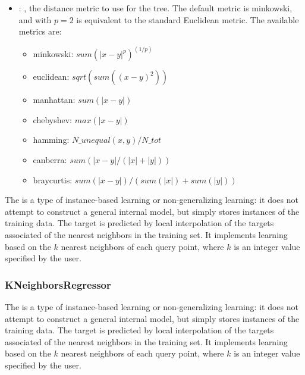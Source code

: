 \begin{itemize}
    \item {}: , 
      the distance metric to use for the tree. The default metric is minkowski, and with
      $p=2$ is equivalent to the standard Euclidean metric.
      The available metrics are:                                                  \begin{itemize}
      \item minkowski: $sum(|x - y|^p)^(1/p)$
      \item euclidean: $sqrt(sum((x - y)^2))$
      \item manhattan: $sum(|x - y|)$                                                    \item
      chebyshev: $max(|x - y|)$                                                    \item hamming:
      $N\_unequal(x, y) / N\_tot$                                                    \item canberra:
      $sum(|x - y| / (|x| + |y|))$                                                    \item
      braycurtis: $sum(|x - y|) / (sum(|x|) + sum(|y|))$
      \end{itemize}
  \end{itemize}
 The  is a type of instance-based learning or
 non-generalizing learning: it does not attempt to construct a general internal
 model, but simply stores instances of the training data.                          The target is
 predicted by local interpolation of the targets associated                          of the nearest
 neighbors in the training set.                          It implements learning based on the $k$
 nearest neighbors of each query point,                          where $k$ is an integer value
 specified by the user.                          

\subsubsection{KNeighborsRegressor}
  The  is a type of instance-based learning or
  non-generalizing learning: it does not attempt to construct a general internal
  model, but simply stores instances of the training data.                          The target is
  predicted by local interpolation of the targets associated                          of the nearest
  neighbors in the training set.                          It implements learning based on the $k$
  nearest neighbors of each query point,                          where $k$ is an integer value
  specified by the user.                          

